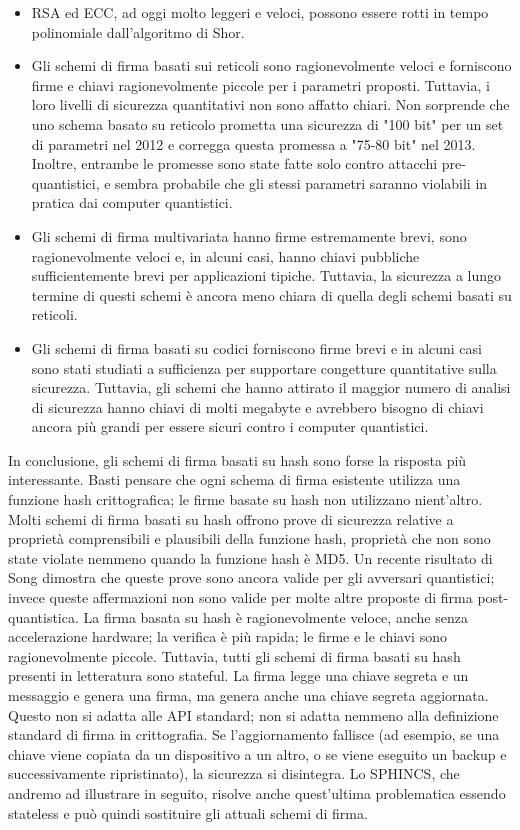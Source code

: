\begin{itemize}
  \item RSA ed ECC, ad oggi molto leggeri e veloci, possono essere rotti in tempo polinomiale dall'algoritmo di Shor.
  \item Gli schemi di firma basati sui reticoli sono ragionevolmente veloci e forniscono firme e chiavi ragionevolmente piccole per i parametri proposti. Tuttavia, i loro livelli di sicurezza quantitativi non sono affatto chiari. Non sorprende che uno schema basato su reticolo prometta una sicurezza di "100 bit" per un set di parametri nel 2012 e corregga questa promessa a "75-80 bit" nel 2013. Inoltre, entrambe le promesse sono state fatte solo contro attacchi pre-quantistici, e sembra probabile che gli stessi parametri saranno violabili in pratica dai computer quantistici.
  \item Gli schemi di firma multivariata hanno firme estremamente brevi, sono ragionevolmente veloci e, in alcuni casi, hanno chiavi pubbliche sufficientemente brevi per applicazioni tipiche. Tuttavia, la sicurezza a lungo termine di questi schemi è ancora meno chiara di quella degli schemi basati su reticoli.
  \item Gli schemi di firma basati su codici forniscono firme brevi e in alcuni casi sono stati studiati a sufficienza per supportare congetture quantitative sulla sicurezza. Tuttavia, gli schemi che hanno attirato il maggior numero di analisi di sicurezza hanno chiavi di molti megabyte e avrebbero bisogno di chiavi ancora più grandi per essere sicuri contro i computer quantistici.
\end{itemize}

In conclusione, gli schemi di firma basati su hash sono forse la risposta più interessante. Basti pensare che ogni schema di firma esistente utilizza una funzione hash crittografica; le firme basate su hash non utilizzano nient'altro. Molti schemi di firma basati su hash offrono prove di sicurezza relative a proprietà comprensibili e plausibili della funzione hash, proprietà che non sono state violate nemmeno quando la funzione hash è MD5. Un recente risultato di Song \cite{Song} dimostra che queste prove sono ancora valide per gli avversari quantistici; invece queste affermazioni non sono valide per molte altre proposte di firma post-quantistica. La firma basata su hash è ragionevolmente veloce, anche senza accelerazione hardware; la verifica è più rapida; le firme e le chiavi sono ragionevolmente piccole. Tuttavia, tutti gli schemi di firma basati su hash presenti in letteratura sono stateful. La firma legge una chiave segreta e un messaggio e genera una firma, ma genera anche una chiave segreta aggiornata. Questo non si adatta alle API standard; non si adatta nemmeno alla definizione standard di firma in crittografia. Se l'aggiornamento fallisce (ad esempio, se una chiave viene copiata da un dispositivo a un altro, o se viene eseguito un backup e successivamente ripristinato), la sicurezza si disintegra. Lo SPHINCS, che andremo ad illustrare in seguito, risolve anche quest'ultima problematica essendo stateless e può quindi sostituire gli attuali schemi di firma.

